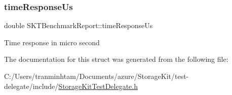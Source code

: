\subsubsection{\texorpdfstring{timeResponseUs}{timeResponseUs}}
{\footnotesize\ttfamily double S\+K\+T\+Benchmark\+Report\+::time\+Response\+Us}

Time response in micro second 

The documentation for this struct was generated from the following file\+:\begin{DoxyCompactItemize}
\item 
C\+:/\+Users/tranminhtam/\+Documents/azure/\+Storage\+Kit/test-\/delegate/include/\mbox{\hyperlink{_storage_kit_test_delegate_8h}{Storage\+Kit\+Test\+Delegate.\+h}}\end{DoxyCompactItemize}
